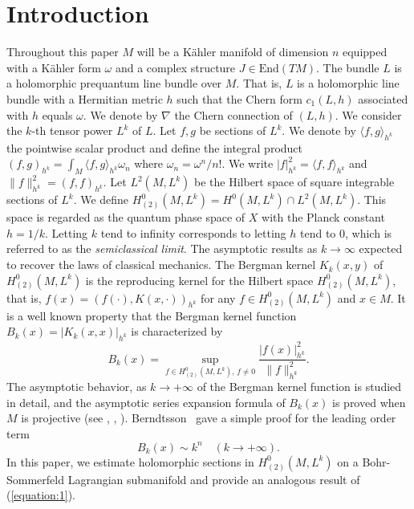 \documentclass[12pt,oneside]{amsart}
\theoremstyle{plain}
\theoremstyle{definition}
\theoremstyle{remark}
\begin{document}
\section{Introduction}\label{section:1}
Throughout this paper $M$ will be a K\"ahler manifold of dimension $n$ equipped with a K\"ahler form $\omega$ and a complex structure $J \in \mathrm{End}(TM)$.   
The bundle $L$ is a holomorphic prequantum line bundle over $M$.  
That is, 
$L$ is a holomorphic line bundle with a Hermitian metric $h$ such that the Chern form $c_{1}(L, h)$ associated with $h$ equals $\omega$.  
We denote by $\nabla$ the Chern connection of $(L, h)$.  
We consider the $k$-th tensor power $L^k$ of $L$.   
Let $f, g$ be sections of $L^k$. 
We denote by $\langle f, g \rangle_{h^k}$ the pointwise scalar product and 
define the integral product
$
(f, g)_{h^k} = \int_{M} \langle f, g \rangle_{h^k} \omega_{n}
$
where $\omega_{n} = \omega^n/n!$.  
We write $|f|^2_{h^k} = \langle f, f \rangle_{h^k}$ and $\|f\|^2_{h^k} = (f, f)_{h^k}$.  
Let $L^2(M, L^k)$ be the Hilbert space of square integrable sections of $L^k$.  
We define $H^{0}_{(2)}(M, L^k) = H^{0}(M, L^k) \cap L^{2}(M, L^k)$.  
This space is regarded as the quantum phase space of $X$ with the Planck constant $h=1/k$.  
Letting $k$ tend to infinity corresponds to letting $h$ tend to 0, which is referred to as the \textit{semiclassical limit}.
The asymptotic results as $k \to \infty$ expected to recover the laws of classical mechanics.  
The Bergman kernel $K_{k}(x, y)$ of $H_{(2)}^0(M, L^k)$ is the reproducing kernel for the Hilbert space $H^{0}_{(2)}(M, L^k)$, that is, $f(x) = (f(\cdot), K(x, \cdot))_{h^k}$ for any $f \in H^0_{(2)}(M, L^k)$ and $x \in M$.  
It is a well known property that the Bergman kernel function $B_{k}(x) = |K_{k}(x, x)|_{h^k}$ is characterized by 
\[
B_{k}(x) = \sup_{f \in H^0_{(2)}(M, L^k),\, f \neq 0} \frac{|f(x)|^2_{h^k}}{\|f\|^2_{h^k}}.  
\]
The asymptotic behavior, as $k \to +\infty$ of the Bergman kernel function is studied in detail, and the asymptotic series expansion formula of $B_{k}(x)$ is proved when $M$ is projective 
(see \cite{Tia}, \cite{Cat}, \cite{Zel}).  
Berndtsson~\cite{Ber} gave a simple proof for the leading order term 
\begin{equation}\label{equation:1}
B_{k}(x) \sim k^n \quad (k \to +\infty).  
\end{equation}
In this paper, we estimate holomorphic sections in $H^0_{(2)} (M, L^k)$ on a Bohr-Sommerfeld Lagrangian submanifold and provide an analogous result of (\ref{equation:1}).  
\end{document}
